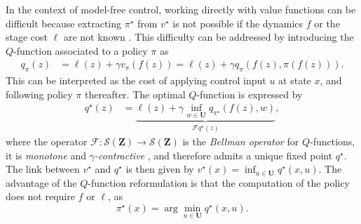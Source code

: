 \documentclass[journal,twoside,web]{ieeecolor}
\newcommand{\F}{\mathcal{F}}
\newcommand{\Zb}{\mathbf{Z}}
\begin{document}
In the context of model-free control, working directly with value functions can be difficult because extracting $\pi^\star$ from $v^\star$ is not possible if the dynamics $f$ or the stage cost $\ell$ are not known \cite{GoranADP}. This difficulty can be addressed by introducing the $Q$-function \cite{WatkinsQLearning} associated to a policy $\pi$ as
%
\begin{align*}
	q_{\pi}(z) & = \ell(z) + \gamma v_{\pi}(f(z)) 
	= \ell(z) + \gamma q_{\pi}(f(z),\pi(f(z))).
\end{align*}
%
This can be interpreted as the cost of applying control input $u$ at state $x$, and following policy $\pi$ thereafter. The optimal $Q$-function is expressed by
%
\begin{align*}
	q^{\star}(z) & = \underbrace{\ell(z) + \gamma \inf_{w\in \mathbf{U}}q_{\pi^\star}(f(z),w)}_{\mathcal{F}q^{\star}(z)},
\end{align*}
%
where the operator $\F : \mathcal{S}(\Zb) \to \mathcal{S}(\Zb)$ is the \textit{Bellman operator} for $Q$-functions, it is \textit{monotone} and \textit{$\gamma$-contractive} \cite{BertsekasVol2}, and therefore admits  a unique fixed point $q^\star$.
The link between $v^\star$ and $q^\star$ is then given by $v^\star(x) = \inf_{u\in \mathbf{U}}q^\star(x,u)$.
The advantage of the $Q$-function reformulation is that the computation of the policy does not require $f$ or $\ell$, as
%
\begin{equation} \label{policy_extraction}
	\pi^\star(x) = \arg \min_{u\in\mathbf{U}}q^\star(x,u).
\end{equation}
%
%
\end{document}
